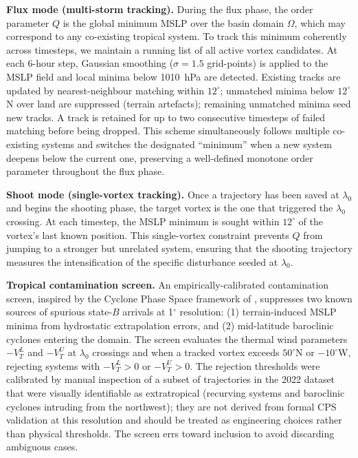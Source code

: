\documentclass[11pt]{article}
\begin{document}
\textbf{Flux mode (multi-storm tracking).}
During the flux phase, the order parameter $Q$ is the global minimum MSLP over the
basin domain $\Omega$, which may correspond to any co-existing tropical system.
To track this minimum coherently across timesteps, we maintain a running list of
all active vortex candidates.  At each 6-hour step, Gaussian smoothing ($\sigma=1.5$
grid-points) is applied to the MSLP field and local minima below 1010~hPa are
detected.  Existing tracks are updated by nearest-neighbour matching within $12^\circ$;
unmatched minima below $12^\circ$N over land are suppressed (terrain artefacts);
remaining unmatched minima seed new tracks.  A track is retained for up to two
consecutive timesteps of failed matching before being dropped.  This scheme simultaneously
follows multiple co-existing systems and switches the designated ``minimum'' when a
new system deepens below the current one, preserving a well-defined monotone order
parameter throughout the flux phase.

\textbf{Shoot mode (single-vortex tracking).}
Once a trajectory has been saved at $\lambda_0$ and begins the shooting phase, the
target vortex is the one that triggered the $\lambda_0$ crossing.  At each timestep,
the MSLP minimum is sought within $12^\circ$ of the vortex's last known position.
This single-vortex constraint prevents $Q$ from jumping to a stronger but unrelated
system, ensuring that the shooting trajectory measures the intensification of the
specific disturbance seeded at $\lambda_0$.

\textbf{Tropical contamination screen.}
An empirically-calibrated contamination screen, inspired by the Cyclone Phase Space
framework of \citet{hart2003cyclone}, suppresses two known sources of spurious
state-$B$ arrivals at 1$^\circ$ resolution: (1) terrain-induced MSLP minima from
hydrostatic extrapolation errors, and (2) mid-latitude baroclinic cyclones entering
the domain. The screen evaluates the thermal wind parameters $-V_T^L$ and $-V_T^U$
at $\lambda_0$ crossings and when a tracked vortex exceeds $50^\circ$N or $-10^\circ$W,
rejecting systems with $-V_T^L > 0$ or $-V_T^U > 0$. The rejection thresholds were
calibrated by manual inspection of a subset of trajectories in the 2022 dataset that
were visually identifiable as extratropical (recurving systems and baroclinic cyclones
intruding from the northwest); they are not derived from formal CPS validation at this
resolution and should be treated as engineering choices rather than physical thresholds.
The screen errs toward inclusion to avoid discarding ambiguous cases.
\end{document}
